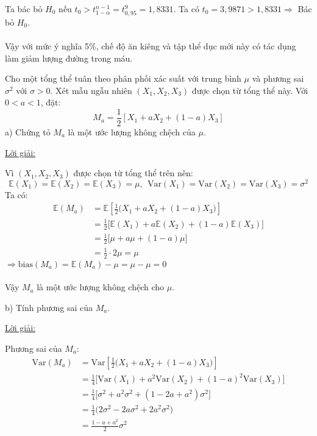 \documentclass[10pt, a4paper]{article}
\begin{document}
Ta bác bỏ $H_0$ nếu $t_0>t^{n-1}_{1-\alpha}=t^9_{0,95}=1,8331$. Ta có $t_0=3,9871>1,8331\Rightarrow$ Bác bỏ $H_0$.\\\\
Vậy với mức ý nghĩa 5\%, chế độ ăn kiêng và tập thể dục mới này có tác dụng làm giảm lượng đường trong máu.
\begin{tcolorbox}[enhanced,colback=blue!5!white,colframe=blue!75!black,sharp corners=all,shadow={0mm}{0mm}{-1.5mm}%
{fill=blue!75!red,opacity=0.3},title=\textbf{Bài 5}]
Cho một tổng thể tuân theo phân phối xác suất với trung bình $\mu$ và phương sai $\sigma^2$ với $\sigma>0$. Xét mẫu ngẫu nhiên $(X_1,X_2,X_3)$ được chọn từ tổng thể này. Với $0<a<1$, đặt: $$M_a=\dfrac12[X_1+aX_2+(1-a)X_3]$$
\color{red}a) \color{black}Chứng tỏ $M_a$ là một ước lượng không chệch của $\mu$.
\end{tcolorbox}
\begin{center}
	\color{blue}\underline{Lời giải:}
\end{center}
Vì $(X_1,X_2,X_3)$ được chọn từ tổng thể trên nên: $$\mathbb E(X_1)=\mathbb E(X_2)=\mathbb E(X_3)=\mu,~~\text{Var}(X_1)=\text{Var}(X_2)=\text{Var}(X_3)=\sigma^2$$
Ta có: \begin{align*}
	\mathbb E(M_a)&=\mathbb E\left[\frac12\big(X_1+aX_2+(1-a)X_3\big)\right]\\
	&=\frac12\big[\mathbb E(X_1)+a\mathbb E(X_2)+(1-a)\mathbb E(X_3)\big]\\
	&=\frac12\big[\mu+a\mu+(1-a)\mu\big]\\
	&=\frac12\cdot2\mu=\mu
\end{align*}
$\Rightarrow\text{bias}(M_a)=\mathbb E(M_a)-\mu=\mu-\mu=0$\\\\
Vậy $M_a$ là một ước lượng không chệch cho $\mu$.
\vspace{3mm}
\begin{tcolorbox}[enhanced,colback=blue!5!white,colframe=blue!75!black,sharp corners=all,shadow={0mm}{0mm}{-1.5mm}%
{fill=blue!75!red,opacity=0.3}]
\color{red}b) \color{black}Tính phương sai của $M_a$.
\end{tcolorbox}
\begin{center}
	\color{blue}\underline{Lời giải:}
\end{center}
Phương sai của $M_a$: \begin{align*}
	\text{Var}(M_a)&=\text{Var}\left[\frac12\big(X_1+aX_2+(1-a)X_3\big)\right]\\
	&=\frac14\big[\text{Var}(X_1)+a^2\text{Var}(X_2)+(1-a)^2\text{Var}(X_3)\big]\\
	&=\frac14\big[\sigma^2+a^2\sigma^2+(1-2a+a^2)\sigma^2\big]\\
	&=\frac14\big(2\sigma^2-2a\sigma^2+2a^2\sigma^2\big)\\
	&=\frac{1-a+a^2}{2}\sigma^2
\end{align*}
\end{document}
